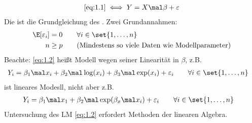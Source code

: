 \begin{align}\label{eq:1.2}%
	\eqref{eq:1.1}
	\iff 
	Y=X\mal\beta+\varepsilon
\end{align}
Die ist die Grundgleichung des .
Zwei Grundannahmen:
\begin{align}\label{eq:1.3}
	\E[\varepsilon_i]&=0\qquad\forall i\in\set{1,\ldots,n}\\
	n&\geq p\qquad\text{(Mindestens so viele Daten wie Modellparameter)}
	\label{eq:1.4}
\end{align}
Beachte: \eqref{eq:1.2} heißt  Modell wegen seiner Linearität in $\beta$, z.B. 
\begin{align*}
	Y_i&=\beta_1\mal x_i+\beta_2\mal\log(x_i)+\beta_3\mal\exp(x_i)+\varepsilon_i
	\qquad\forall i\in\set{1,\ldots,n}
\end{align*}
ist lineares Modesll, nicht aber z.B.
\begin{align*}
	Y_i&=\beta_1\mal x_1+\beta_2\mal\exp(\beta_x\mal x_i)+\varepsilon_i
	\qquad\forall i\in\set{1,\ldots,n}
\end{align*}
Untersuchung des LM \eqref{eq:1.2} erfordert Methoden der linearen Algebra.



